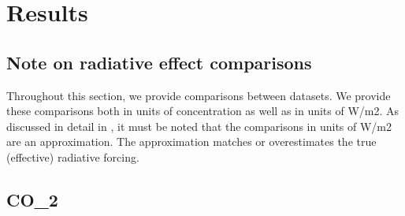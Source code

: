 \section{Results}
\label{sec:results}


\subsection{Note on radiative effect comparisons}
\label{ssec:results-radiative-forcing-comparisons-note}

Throughout this section, we provide comparisons between datasets.
We provide these comparisons both in units of concentration as well as in units of W/m2.
As discussed in detail in \citet{nicholls_historical-ghgs_2026},
it must be noted that the comparisons in units of W/m2 are an approximation.
The approximation matches or overestimates the true (effective) radiative forcing.

\subsection{CO_2}
\label{ssec:results-co2}


